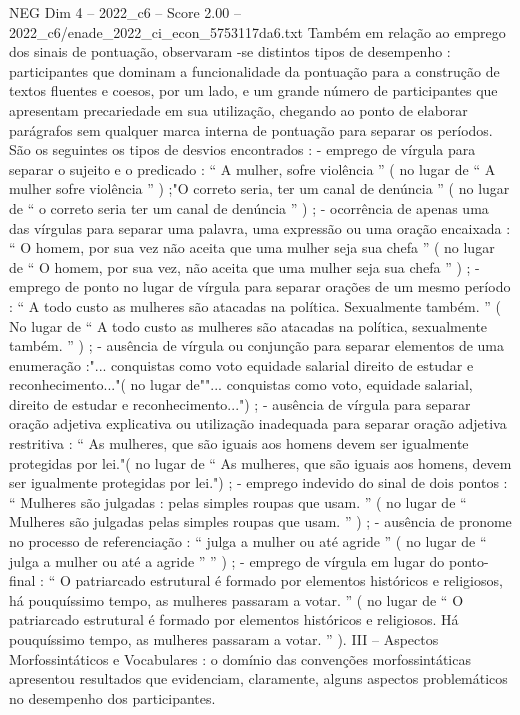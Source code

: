 \begin{textsample}{NEG Dim 4 – 2022\_c6 – Score 2.00 – 2022\_c6/enade\_2022\_ci\_econ\_5753117da6.txt}
Também em relação ao emprego dos sinais de pontuação, observaram -se distintos tipos de desempenho : participantes que dominam a funcionalidade da pontuação para a construção de textos fluentes e coesos, por um lado, e um grande número de participantes que apresentam precariedade em sua utilização, chegando ao ponto de elaborar parágrafos sem qualquer marca interna de pontuação para separar os períodos.
São os seguintes os tipos de desvios encontrados : - emprego de vírgula para separar o sujeito e o predicado : “ A mulher, sofre violência ” ( no lugar de “ A mulher sofre violência ” ) ;"O correto seria, ter um canal de denúncia ” ( no lugar de “ o correto seria ter um canal de denúncia ” ) ; - ocorrência de apenas uma das vírgulas para separar uma palavra, uma expressão ou uma oração encaixada : “ O homem, por sua vez não aceita que uma mulher seja sua chefa ” ( no lugar de “ O homem, por sua vez, não aceita que uma mulher seja sua chefa ” ) ; - emprego de ponto no lugar de vírgula para separar orações de um mesmo período : “ A todo custo as mulheres são atacadas na política.
Sexualmente também. ” ( No lugar de “ A todo custo as mulheres são atacadas na política, sexualmente também. ” ) ; - ausência de vírgula ou conjunção para separar elementos de uma enumeração :"... conquistas como voto equidade salarial direito de estudar e reconhecimento..."( no lugar de""... conquistas como voto, equidade salarial, direito de estudar e reconhecimento...") ; - ausência de vírgula para separar oração adjetiva explicativa ou utilização inadequada para separar oração adjetiva restritiva : “ As mulheres, que são iguais aos homens devem ser igualmente protegidas por lei."( no lugar de “ As mulheres, que são iguais aos homens, devem ser igualmente protegidas por lei.") ; - emprego indevido do sinal de dois pontos : “ Mulheres são julgadas : pelas simples roupas que usam. ” ( no lugar de “ Mulheres são julgadas pelas simples roupas que usam. ” ) ; - ausência de pronome no processo de referenciação : “ julga a mulher ou até agride ” ( no lugar de “ julga a mulher ou até a agride ” ” ) ; - emprego de vírgula em lugar do ponto-final : “ O patriarcado estrutural é formado por elementos históricos e religiosos, há pouquíssimo tempo, as mulheres passaram a votar. ” ( no lugar de “ O patriarcado estrutural é formado por elementos históricos e religiosos.
Há pouquíssimo tempo, as mulheres passaram a votar. ” ).
III – Aspectos Morfossintáticos e Vocabulares : o domínio das convenções morfossintáticas apresentou resultados que evidenciam, claramente, alguns aspectos problemáticos no desempenho dos participantes.

\end{textsample}
